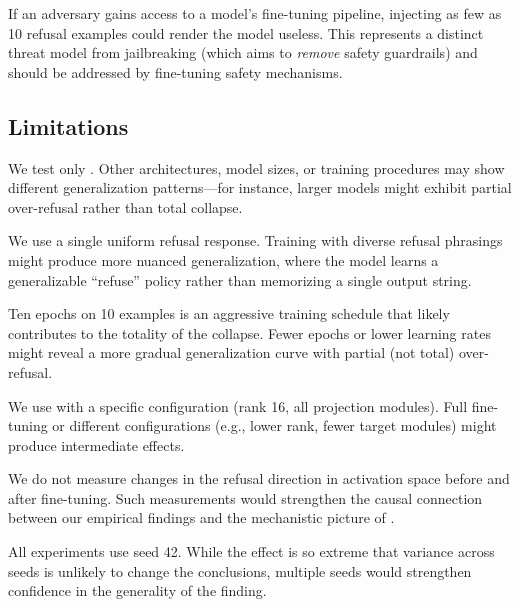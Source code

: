 If an adversary gains access to a model's fine-tuning pipeline, injecting as few as 10 refusal examples could render the model useless. This represents a distinct threat model from jailbreaking (which aims to \emph{remove} safety guardrails) and should be addressed by fine-tuning safety mechanisms.

\subsection{Limitations}
\label{sec:limitations}

We test only \qwen. Other architectures, model sizes, or training procedures may show different generalization patterns---for instance, larger models might exhibit partial over-refusal rather than total collapse.

We use a single uniform refusal response. Training with diverse refusal phrasings might produce more nuanced generalization, where the model learns a generalizable ``refuse'' policy rather than memorizing a single output string.

Ten epochs on 10 examples is an aggressive training schedule that likely contributes to the totality of the collapse. Fewer epochs or lower learning rates might reveal a more gradual generalization curve with partial (not total) over-refusal.

We use \lora with a specific configuration (rank 16, all projection modules). Full fine-tuning or different \lora configurations (e.g., lower rank, fewer target modules) might produce intermediate effects.

We do not measure changes in the refusal direction in activation space before and after fine-tuning. Such measurements would strengthen the causal connection between our empirical findings and the mechanistic picture of \citet{arditi2024refusal}.

All experiments use seed 42. While the effect is so extreme that variance across seeds is unlikely to change the conclusions, multiple seeds would strengthen confidence in the generality of the finding.
